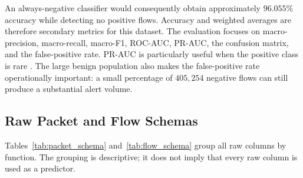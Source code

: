 An always-negative classifier would consequently obtain approximately
$96.055\%$ accuracy while detecting no positive flows. Accuracy and weighted
averages are therefore secondary metrics for this dataset. The evaluation
focuses on macro-precision, macro-recall, macro-F1, ROC-AUC, PR-AUC, the
confusion matrix, and the false-positive rate. PR-AUC is particularly useful
when the positive class is rare \cite{SaitoRehmsmeier2015}. The large benign
population also makes the false-positive rate operationally important: a small
percentage of $405{,}254$ negative flows can still produce a substantial alert
volume.

\subsection{Raw Packet and Flow Schemas}
\label{subsec:raw_schemas}

Tables~\ref{tab:packet_schema} and~\ref{tab:flow_schema} group all raw columns
by function. The grouping is descriptive; it does not imply that every raw
column is used as a predictor.

